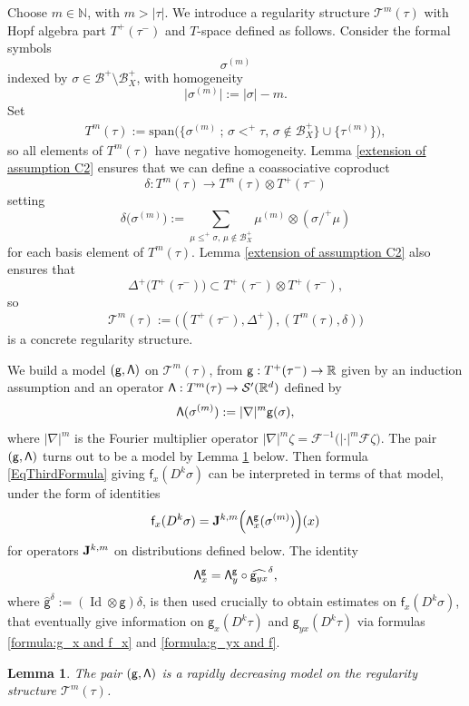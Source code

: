 \documentclass[JEP,XML,SOM,Unicode,published]{cedram}
\theoremstyle{plain}
\newtheorem{lem}[thm]{Lemma}
\theoremstyle{definition}
\DeclareMathOperator{\iden}{Id}
\newcommand{\sff}{\mathsf{f}}
\newcommand{\sfg}{\mathsf{g}}
\newcommand{\scrT}{\mathscr{T}}
\newcommand{\bbN}{\mathbb{N}}
\newcommand{\bbR}{\mathbb{R}}
\newcommand{\mcB}{\mathcal{B}}
\newcommand{\mcF}{\mathcal{F}}
\begin{document}
Choose $m\in\bbN$, with $m>\vert\tau\vert$. We introduce a regularity structure $\scrT^m(\tau)$ with Hopf algebra part $T^+(\tau^-)$ and $T$-space defined as follows.
Consider the formal symbols
\[
\sigma^{(m)}
\]
indexed by $\sigma\in\mcB^+\setminus\mcB_X^+$, with homogeneity
\[
\big|\sigma^{(m)}\big| := |\sigma| - m.
\]
Set
\begin{align*}
T^m(\tau) := \textrm{span}
\bigl(\big\{\sigma^{(m)}\ ;\,\sigma<^+\tau,\, \sigma\notin\mcB_X^+\big\}
\cup\big\{\tau^{(m)}\big\}\bigr),
\end{align*}
so all elements of $T^m(\tau)$ have negative homogeneity.
Lemma \ref{extension of assumption C2} ensures that we can define a coassociative coproduct
\[
\delta: T^m(\tau)\to T^m(\tau)\otimes T^+(\tau^-)
\]
setting
\[
\delta\bigl(\sigma^{(m)}\bigr) := \sum_{\mu\leq^+\sigma,\,\mu\notin\mcB_X^+} \mu^{(m)}\otimes(\sigma/^+\mu)
\]
for each basis element of $T^m(\tau)$.
Lemma \ref{extension of assumption C2} also ensures that
\[
\Delta^+\bigl(T^+(\tau^-)\bigr) \subset T^+(\tau^-)\otimes T^+(\tau^-),
\]
so
\[
\scrT^m(\tau) := \bigl((T^+(\tau^-),\Delta^+), (T^m(\tau),\delta)\bigr)
\]
is a concrete regularity structure.

We build a model $\sf (g,\Lambda)$ on $\scrT^m(\tau)$, from ${\sf g} : T^+(\tau^-)\to\bbR$ given by an induction assumption and an operator ${\sf\Lambda}:T^m(\tau)\to\mathcal{S}'(\mathbb{R}^d)$ defined by
\[
{\sf\Lambda}(\sigma^{(m)}) := |\nabla|^m {\sf g}(\sigma),
\]
where $|\nabla|^m$ is the Fourier multiplier operator $|\nabla|^m\zeta = \mcF^{-1}\bigl(|{\cdot}|^m\mcF\zeta\bigr)$.
The pair $\sf(g,\Lambda)$ turns out to be a model by Lemma \ref{lem:model on T^M} below. Then formula \eqref{EqThirdFormula} giving $\sff_x(D^k\sigma)$ can be interpreted in terms of that model, under the form of identities
\[
\sff_x(D^k\sigma) = {\bf J}^{k,m}\Bigl({\sf \Lambda}^\sfg_x(\sigma^{(m)})\Bigr)(x)
\]
for operators ${\bf J}^{k,m}$ on distributions defined below. The identity
\[
{\sf \Lambda}^\sfg_x = {\sf \Lambda}^\sfg_y \circ\widehat{\sfg_{yx}}^\delta,
\]
where $\widehat{\sfg}^\delta := (\iden\otimes \sfg)\delta$, is then used crucially to obtain estimates on $\sff_x(D^k\sigma)$, that eventually give information on $\sfg_x(D^k\tau)$ and $\sfg_{yx}(D^k\tau)$ via formulas \eqref{formula:g_x and f_x} and \eqref{formula:g_yx and f}.

\begin{lem}\label{lem:model on T^M}
The pair $({\sf g},{\sf\Lambda})$ is a rapidly decreasing model on the regularity structure $\scrT^m(\tau)$.
\end{lem}
\end{document}
